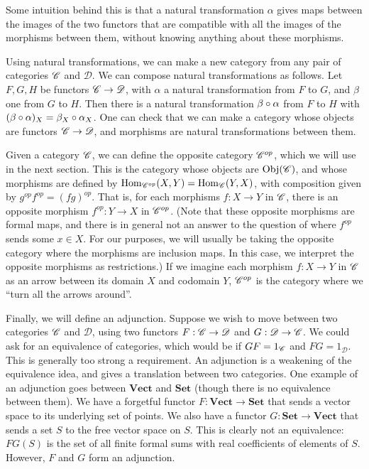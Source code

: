 \documentclass[a4paper,12pt,leqno]{article} \usepackage{amsmath}
\newcommand{\curD}{\mathscr{D}} \newcommand{\curI}{\mathscr{I}}
\newcommand{\Hom}{\ensuremath{\operatorname{Hom}}}
\newcommand{\Obj}{\ensuremath{\operatorname{Obj}}}
\theoremstyle{definition}
\begin{document}
Some intuition behind this is that a natural transformation $\alpha$ gives maps
between the images of the two functors that are compatible with all the
images of the morphisms between them, without knowing anything about these
morphisms. 

Using natural transformations, we can make a new category from any pair of
categories $\mathscr{C}$ and $\curD$.
We can compose natural transformations as follows.
Let $F, G, H$ be functors $\curC\to \curD$, with $\alpha$ a natural
transformation from $F$ to $G$, and $\beta$ one from $G$ to $H$.
Then there is a natural transformation $\beta\circ\alpha$ from $F$ to $H$ with
$(\beta\circ\alpha)_X = \beta_X\circ\alpha_X$.
One can check that we can make a category whose objects are functors
$\curC\to\curD$, and morphisms are natural transformations between them.

Given a category $\mathscr{C}$, we can define the opposite category $\mathscr{C}^{op}$,
which we will use in the next section.
This is the category whose objects are
$\Obj(\curC)$, and whose morphisms are defined by $\Hom_{\curC^{op}}(X, Y)
= \Hom_{\curC}(Y, X)$, with composition given by $g^{op}f^{op} = (fg)^{op}$.
That is, for each morphisms $f: X\to Y$ in $\mathscr{C}$, there is an opposite
morphism $f^{op}: Y\to X$ in $\mathscr{C}^{op}$.
(Note that these opposite morphisms
are formal maps, and there is in general not an answer to the question of where
$f^{op}$ sends some $x\in X$.
For our purposes, we will usually be taking the
opposite category where the morphisms are inclusion maps.
In this case, we
interpret the opposite morphisms as restrictions.) If we imagine each morphism
$f: X\to Y$ in $\mathscr{C}$ as an arrow between its domain $X$ and codomain $Y$,
$\mathscr{C}^{op}$ is the category where we ``turn all the arrows around''.

Finally, we will define an adjunction.
Suppose we wish to move between two
categories $\mathscr{C}$ and $\curD$, using two functors $F: \curC\to\curD$ and $G:
\curD\to\curC$.
We could ask for an equivalence of categories, which would be
if $GF = 1_{\mathscr{C}}$ and $FG = 1_{\curD}$.
This is generally too strong
a requirement.
An adjunction is a weakening of the equivalence idea, and gives
a translation between two categories.
One example of an adjunction goes between
$\textbf{Vect}$ and $\textbf{Set}$ (though there is no equivalence between
them).
We have a forgetful functor $F: \textbf{Vect}\to \textbf{Set}$ that
sends a vector space to its underlying set of points.
We also have a functor
$G: \textbf{Set}\to \textbf{Vect}$ that sends a set $S$ to the free vector space
on $S$.
This is clearly not an equivalence: $FG(S)$ is the set of all finite
formal sums with real coefficients of elements of $S$.
However, $F$ and $G$
form an adjunction.
\end{document}
